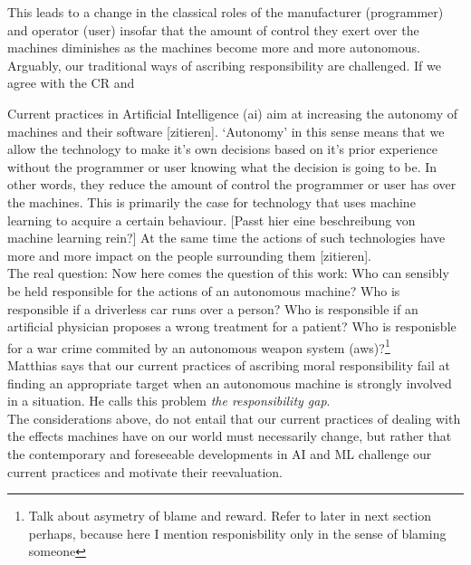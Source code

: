 \documentclass{article}
\begin{document}
This leads to a change in the classical roles of the manufacturer
(programmer) and operator (user) insofar that the amount of control they exert
over the machines diminishes as the machines become more and more autonomous.
Arguably, our traditional ways of ascribing responsibility are challenged. If we
agree with the CR and 


Current practices in Artificial Intelligence (\acrshort{ai}) aim at increasing
the autonomy of machines and their software [zitieren]. `Autonomy' in this sense
means that we allow the technology to make it's own decisions based on it's
prior experience without the programmer or user knowing what the decision is
going to be. In other words, they reduce the amount of control the programmer or
user has over the machines. This is primarily the case for technology that uses
machine learning to acquire a certain behaviour. [Passt hier eine beschreibung
von machine learning rein?] At the same time the actions of
such technologies have more and more impact on the people surrounding them
[zitieren].\\

The real question:
Now here comes the question of this work: Who can sensibly be held responsible for the
actions of an autonomous machine?
Who is responsible if a driverless car runs over a person? Who is responsible if
an artificial physician proposes a wrong treatment for a patient? Who is
responisble for a war crime commited by an autonomous weapon system
(\acrshort{aws})?\footnote{Talk about asymetry of blame and reward. Refer to
later in next section perhaps, because here I mention responisbility only in the
sense of blaming someone}\\

Matthias says that our current practices of ascribing moral responsibility
fail at finding an appropriate target when an autonomous machine is
strongly involved in a situation. He calls this problem \textit{the
responsibility gap}.\\

The considerations above, do not entail that our current practices of
dealing with the effects machines have on our world must necessarily change,
but rather that the contemporary and foreseeable developments in AI and ML
challenge our current practices and motivate their reevaluation.
\end{document}

